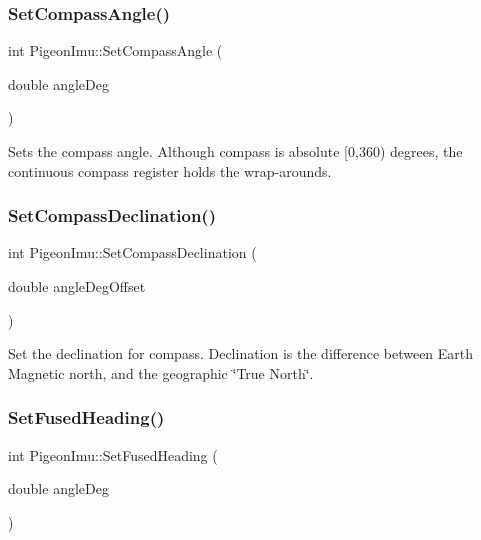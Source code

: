 \mbox{\label{class_pigeon_imu_a12dbe41e1e7bbcd6bd84d3294a5f82eb}} 
\subsubsection{\texorpdfstring{Set\+Compass\+Angle()}{SetCompassAngle()}}
{\footnotesize\ttfamily int Pigeon\+Imu\+::\+Set\+Compass\+Angle (\begin{DoxyParamCaption}\item[{double}]{angle\+Deg }\end{DoxyParamCaption})}

Sets the compass angle. Although compass is absolute \mbox{[}0,360) degrees, the continuous compass register holds the wrap-\/arounds. \mbox{\label{class_pigeon_imu_a92246bd9e20249a1bf91402ad2477587}} 
\subsubsection{\texorpdfstring{Set\+Compass\+Declination()}{SetCompassDeclination()}}
{\footnotesize\ttfamily int Pigeon\+Imu\+::\+Set\+Compass\+Declination (\begin{DoxyParamCaption}\item[{double}]{angle\+Deg\+Offset }\end{DoxyParamCaption})}

Set the declination for compass. Declination is the difference between Earth Magnetic north, and the geographic \char`\"{}\+True North\char`\"{}. \mbox{\label{class_pigeon_imu_a32a7f752dd5b912289de592df53f6c84}} 
\subsubsection{\texorpdfstring{Set\+Fused\+Heading()}{SetFusedHeading()}}
{\footnotesize\ttfamily int Pigeon\+Imu\+::\+Set\+Fused\+Heading (\begin{DoxyParamCaption}\item[{double}]{angle\+Deg }\end{DoxyParamCaption})}


